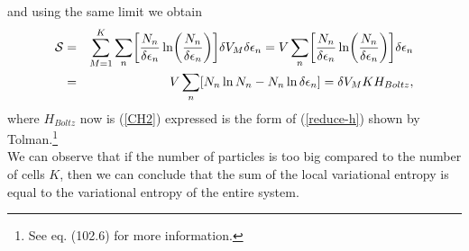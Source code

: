 and using the same limit we obtain
\begin{eqnarray}
    \Ss&=& \sum_{M=1}^{K} \sum_n
    \left[  
           \frac{N_{n}}{ \delta \epsilon_{n}} \ln 
           \left( 
                  \frac{N_{n}}{ \delta \epsilon_{n}}
           \right)
    \right]  \de V_M \delta \epsilon_{n} = V \sum_n
    \left[  
           \frac{N_{n}}{ \delta \epsilon_{n}} \ln 
           \left( 
                  \frac{N_{n}}{ \delta \epsilon_{n}}
           \right)
    \right] \delta \epsilon_{n} \nonumber \\
    &=& V \sum_n \left[N_n \ln N_n - N_n \ln \delta \epsilon_n  \right]=\de V_M K H_{Boltz},\label{h-quantic4}
\end{eqnarray}
where $H_{Boltz}$ now is (\ref{CH2}) expressed is the form of (\ref{reduce-h}) shown by Tolman.\footnote{See \cite{tolman} eq. (102.6) for more information.}\\
We can observe that if the number of particles is too big compared to the number of cells $K$, then we can conclude that the sum of the local variational entropy is equal to the variational entropy of the entire system.\\
